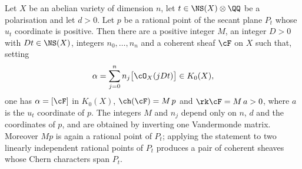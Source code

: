 \begin{theorem}\label{thm:secantexists}
Let $X$ be an abelian variety of dimension $n$, let $t\in\NS(X)\otimes\QQ$ be a
polarisation and let $d>0$. Let $p$ be a rational point of the secant plane
$P_{t}$ whose $u_{t}$ coordinate is positive. Then there are a positive
integer $M$, an integer $D>0$ with $Dt\in\NS(X)$, integers $n_{0},\dots,n_{n}$
and a coherent sheaf $\cF$ on $X$ such that, setting
\begin{equation}\label{eq:lbwitness}
  \alpha=\sum_{j=0}^{n}n_{j}\bigl[\cO_{X}(jDt)\bigr]\in K_{0}(X),
\end{equation}
one has $\alpha=[\cF]$ in $K_{0}(X)$, $\ch(\cF)=M\,p$ and
$\rk\cF=M\,a>0$, where $a$ is the $u_{t}$ coordinate of $p$. The integers $M$
and $n_{j}$ depend only on $n$, $d$ and the coordinates of $p$, and are
obtained by inverting one Vandermonde matrix. Moreover $Mp$ is again a
rational point of $P_{t}$; applying the statement to two linearly independent
rational points of $P_{t}$ produces a pair of coherent sheaves whose Chern
characters span $P_{t}$.
\end{theorem}


